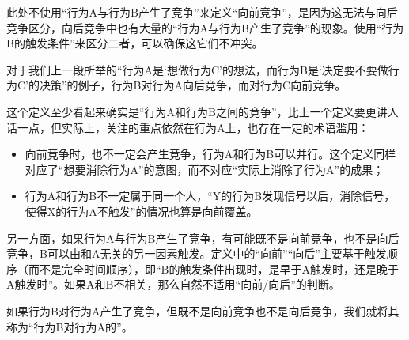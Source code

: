 \begin{explain}
此处不使用“行为A与行为B产生了竞争”来定义“向前竞争”，是因为这无法与向后竞争区分，向后竞争中也有大量的“行为A与行为B产生了竞争”的现象。使用“行为B的触发条件”来区分二者，可以确保这它们不冲突。

对于我们上一段所举的“行为A是‘想做行为C’的想法，而行为B是‘决定要不要做行为C’的决策”的例子，行为B对行为A向后竞争，而对行为C向前竞争。

这个定义至少看起来确实是“行为A和行为B之间的竞争”，比上一个定义要更讲人话一点，但实际上，关注的重点依然在行为A上，也存在一定的术语滥用：
\begin{itemize}
\item 向前竞争时，也不一定会产生竞争，行为A和行为B可以并行。这个定义同样对应了“想要消除行为A”的意图，而不对应“实际上消除了行为A”的成果；

\item 行为A和行为B不一定属于同一个人，“Y的行为B发现信号以后，消除信号，使得X的行为A不触发”的情况也算是向前覆盖。
\end{itemize}
另一方面，如果行为A与行为B产生了竞争，有可能既不是向前竞争，也不是向后竞争，B可以由和A无关的另一因素触发。定义中的“向前”“向后”主要基于触发顺序（而不是完全时间顺序），即“B的触发条件出现时，是早于A触发时，还是晚于A触发时”。如果A和B不相关，那么自然不适用“向前/向后”的判断。
\end{explain}
如果行为B对行为A产生了竞争，但既不是向前竞争也不是向后竞争，我们就将其称为“行为B对行为A的”。

